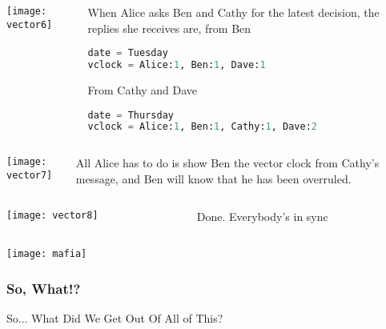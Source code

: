 \documentclass[aspectratio=169, 15pt,usenames,dvipsnames]{beamer}
\begin{document}
	\cprotEnv\begin{gdblank}
	\begin{columns}
		\begin{column}{0.5\textwidth}
			\texttt{[image: vector6]}			
		\end{column}
		\begin{column}{0.5\textwidth}				
			When Alice asks Ben and Cathy for the latest decision, the replies she receives are, from Ben
			\begin{lstlisting}[language=Python]
date = Tuesday
vclock = Alice:1, Ben:1, Dave:1
			\end{lstlisting}
			From Cathy and Dave
			\begin{lstlisting}[language=Python]
date = Thursday
vclock = Alice:1, Ben:1, Cathy:1, Dave:2
			\end{lstlisting}
		\end{column}	
	\end{columns} 
	\note{
		Вторник и четверг
	}
	\end{gdblank}
	\cprotEnv\begin{gdblank}
	\begin{columns}
		\begin{column}{0.5\textwidth}
			\texttt{[image: vector7]}			
		\end{column}
		\begin{column}{0.5\textwidth}				
			All Alice has to do is show Ben the vector clock from Cathy’s message, and Ben will know that he has been overruled.
		\end{column}	
	\end{columns} 
	\end{gdblank}
	\cprotEnv\begin{gdblank}
	\begin{columns}
		\begin{column}{0.5\textwidth}
			\texttt{[image: vector8]}			
		\end{column}
		\begin{column}{0.5\textwidth}				
			Done. Everybody's in sync
		\end{column}	
	\end{columns} 
	\end{gdblank}
	\begin{gdblank}		
		\centering
		\texttt{[image: mafia]}
	\end{gdblank}
	\begin{gdblank}
		\frametitle{So, What!?}
		\centering
		\LARGE 
		So... What Did We Get Out Of All of This?
	\end{gdblank}	
\end{document}

